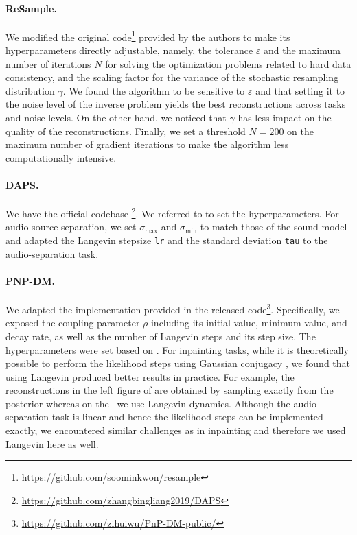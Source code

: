 \paragraph*{ReSample.}
We modified the original code\footnote{\url{https://github.com/soominkwon/resample}} provided by the authors to make its hyperparameters directly adjustable, namely, the tolerance $\varepsilon$ and the maximum number of iterations $N$ for solving the optimization problems related to hard data consistency, and the scaling factor for the variance of the stochastic resampling distribution $\gamma$.
We found the algorithm to be sensitive to $\varepsilon$ and that setting it to the noise level of the inverse problem yields the best reconstructions across tasks and noise levels.
On the other hand, we noticed that $\gamma$ has less impact on the quality of the reconstructions.
Finally, we set a threshold $N=200$ on the maximum number of gradient iterations to make the algorithm less computationally intensive.

\paragraph*{DAPS.}
We have the official codebase \footnote{\url{https://github.com/zhangbingliang2019/DAPS}}.
We referred to \citet[Table.~7]{zhang2024daps} to set the hyperparameters.
For audio-source separation, we set $\sigma_{\max}$ and $\sigma_{\min}$ to match those of the sound model and adapted the Langevin stepsize \texttt{lr} and the standard deviation \texttt{tau} to the audio-separation task.

\paragraph*{PNP-DM.}
We adapted the implementation provided in the released code\footnote{\url{https://github.com/zihuiwu/PnP-DM-public/}}.
Specifically, we exposed the coupling parameter $\rho$ including its initial value, minimum value, and decay rate, as well as the number of Langevin steps and its step size.
The hyperparameters were set based on \citet[Table 3 and Table 4]{wu2024pnpdm}.
For inpainting tasks, while it is theoretically possible to perform the likelihood steps using Gaussian conjugacy \citep[Sec.~3.1]{wu2024pnpdm}, we found that using Langevin produced better results in practice. For example, the reconstructions in the left figure of  are obtained by sampling exactly from the posterior whereas on the \rhs\ we use Langevin dynamics. 
Although the audio separation task is linear and hence the likelihood steps can be implemented exactly, we encountered similar challenges as in inpainting and therefore we used Langevin here as well.


